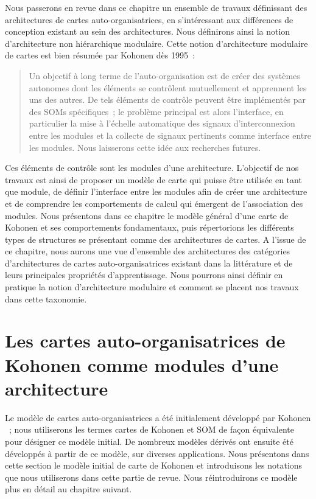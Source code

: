\documentclass[../main]{subfiles}
\begin{document}
Nous passerons en revue dans ce chapitre un ensemble de travaux définissant des architectures de cartes auto-organisatrices, en s'intéressant aux différences de conception existant au sein des architectures. Nous définirons ainsi la notion d'architecture non hiérarchique modulaire.
Cette notion d'architecture modulaire de cartes est bien résumée par Kohonen dès 1995~:
\begin{quote}
Un objectif à long terme de l'auto-organisation est de créer des systèmes autonomes dont les éléments se contrôlent mutuellement et apprennent les uns des autres. De tels éléments de contrôle peuvent être implémentés par des SOMs spécifiques~; le problème principal est alors l'interface, en particulier la mise à l'échelle automatique des signaux d'interconnexion entre les modules et la collecte de signaux pertinents comme interface entre les modules. Nous laisserons cette idée aux recherches futures.
\cite{Kohonen1995SelfOrganizingM}
\end{quote}
Ces éléments de contrôle sont les modules d'une architecture. 
L'objectif de nos travaux est ainsi de proposer un modèle de carte qui puisse être utilisée en tant que module, de définir l'interface entre les modules afin de créer une architecture et de comprendre les comportements de calcul qui émergent de l'association des modules.
Nous présentons dans ce chapitre le modèle général d'une carte de Kohonen et ses comportements fondamentaux, puis répertorions les différents types de structures se présentant comme des architectures de cartes.
A l'issue de ce chapitre, nous aurons une vue d'ensemble des architectures des catégories d'architectures de cartes auto-organisatrices existant dans la littérature et de leurs principales propriétés d'apprentissage. Nous pourrons ainsi définir en pratique la notion d'architecture modulaire et comment se placent nos travaux dans cette taxonomie.

\section{Les cartes auto-organisatrices de Kohonen comme modules d'une architecture}\label{sec:som001}

Le modèle de cartes auto-organisatrices a été initialement développé par Kohonen \cite{Kohonen1982}~; nous utiliserons les termes cartes de Kohonen et SOM de façon équivalente pour désigner ce modèle initial.
De nombreux modèles dérivés ont ensuite été développés à partir de ce modèle, sur diverses applications.
Nous présentons dans cette section le modèle initial de carte de Kohonen et introduisons les notations que nous utiliserons dans cette partie de revue. 
Nous réintroduirons ce modèle plus en détail au chapitre suivant.
\end{document}
